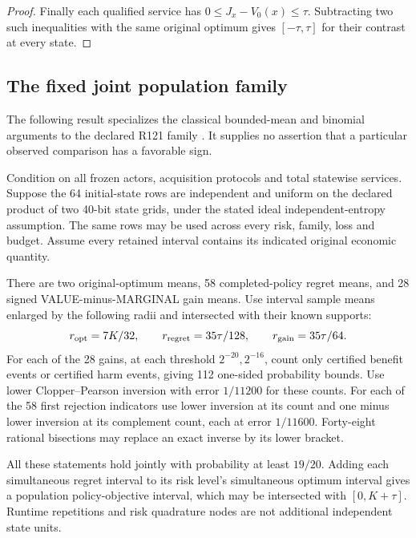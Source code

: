 \begin{proof}
Finally each qualified service has
\(0\leq J_x-V_0(x)\leq\tau\).
Subtracting two such inequalities
with the same original optimum
gives \([-\tau,\tau]\) for their
contrast at every state.
\end{proof}

\subsection{The fixed joint population family}
\label{supp:inference121}

The following result specializes the
classical bounded-mean and binomial
arguments to the declared R121 family
\citep{hoeffding1963,clopperpearson1934}.
It supplies no assertion that a
particular observed comparison has
a favorable sign.

\begin{proposition}
\label{prop:jointinference121}
Condition on all frozen actors,
acquisition protocols and total
statewise services.  Suppose the
64 initial-state rows are independent
and uniform on the declared product
of two 40-bit state grids, under the
stated ideal independent-entropy
assumption.  The same rows may be
used across every risk, family,
loss and budget.
Assume every retained interval
contains its indicated original
economic quantity.

There are two original-optimum
means, 58 completed-policy regret
means, and 28 signed
VALUE-minus-MARGINAL gain means.
Use interval sample means enlarged
by the following radii and
intersected with their known supports:
\[
 r_{\rm opt}=7K/32,\qquad
 r_{\rm regret}=35\tau/128,\qquad
 r_{\rm gain}=35\tau/64 .
\]
For each of the 28 gains, at each
threshold \(2^{-20},2^{-16}\),
count only certified benefit events
or certified harm events, giving
112 one-sided probability bounds.
Use lower Clopper--Pearson inversion
with error \(1/11200\) for these
counts.  For each of the 58 first
rejection indicators use lower
inversion at its count and one
minus lower inversion at its
complement count, each at error
\(1/11600\).
Forty-eight rational bisections
may replace an exact inverse by
its lower bracket.

All these statements hold jointly
with probability at least \(19/20\).
Adding each simultaneous regret
interval to its risk level's
simultaneous optimum interval
gives a population policy-objective
interval, which may be intersected
with \([0,K+\tau]\).
Runtime repetitions and risk
quadrature nodes are not additional
independent state units.
\end{proposition}

